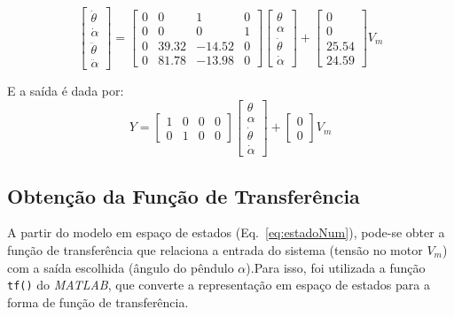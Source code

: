 \documentclass[9pt,a4paper,twocolumn,twoside]{tau-class/tau}
\begin{document}
\begin{equation}
\begin{bmatrix}
\dot{\theta} \\
\dot{\alpha} \\
\ddot{\theta} \\
\ddot{\alpha}
\end{bmatrix}
=
\begin{bmatrix}
0 & 0 & 1 & 0 \\
0 & 0 & 0 & 1 \\
0 & 39.32 & -14.52 & 0 \\
0 & 81.78 & -13.98 & 0
\end{bmatrix}
\begin{bmatrix}
\theta \\ \alpha \\ \dot{\theta} \\ \dot{\alpha}
\end{bmatrix}
+
\begin{bmatrix}
0 \\ 0 \\ 25.54 \\ 24.59
\end{bmatrix} V_m
\tag{28}
\end{equation}

E a saída é dada por:
\begin{equation}
Y =
\begin{bmatrix}
1 & 0 & 0 & 0 \\
0 & 1 & 0 & 0
\end{bmatrix}
\begin{bmatrix}
\theta \\ \alpha \\ \dot{\theta} \\ \dot{\alpha}
\end{bmatrix}
+
\begin{bmatrix}
0 \\ 0
\end{bmatrix} V_m
\tag{29}
\end{equation}

\subsection{Obtenção da Função de Transferência}

A partir do modelo em espaço de estados (Eq.~\ref{eq:estadoNum}), pode-se obter a 
função de transferência que relaciona a entrada do sistema (tensão no motor $V_m$) 
com a saída escolhida (ângulo do pêndulo $\alpha$).Para isso, foi utilizada a 
função \texttt{tf()} do \textit{MATLAB}, que converte a representação em espaço 
de estados para a forma de função de transferência.
\end{document}

